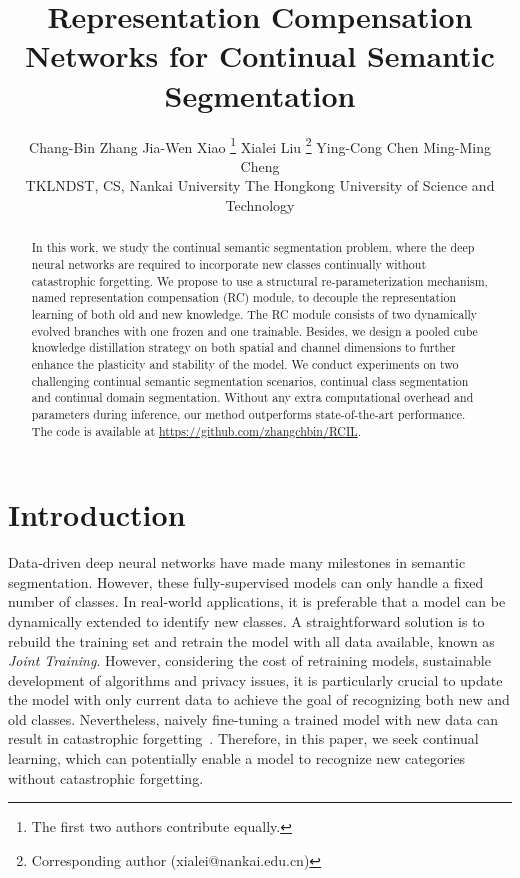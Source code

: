\documentclass[10pt,twocolumn,letterpaper]{article}
\begin{document}
\title{Representation Compensation Networks for Continual Semantic Segmentation}

\author{
Chang-Bin Zhang  \qquad
Jia-Wen Xiao \thanks{The first two authors contribute equally.} \qquad
Xialei Liu \thanks{Corresponding author (xialei@nankai.edu.cn)} \qquad
Ying-Cong Chen  \qquad
Ming-Ming Cheng  \\
 TKLNDST, CS, Nankai University \qquad
 The Hongkong University of Science and Technology\\
}

\maketitle

\begin{abstract}


In this work, we study the continual semantic segmentation problem, where the deep neural networks are required to incorporate new classes continually without catastrophic forgetting. 
We propose to use a structural re-parameterization mechanism, named representation compensation (RC) module,
to decouple the representation learning of both old and new knowledge. The RC module consists of two dynamically evolved branches with one frozen and one trainable.
Besides, we design a pooled cube knowledge distillation strategy 
on both spatial and channel dimensions 
to further enhance the plasticity and stability of the model.
We conduct experiments on two challenging continual semantic segmentation scenarios,
continual class segmentation and continual domain segmentation.
Without any extra computational overhead and parameters during inference, 
our method outperforms state-of-the-art performance.
The code is available at \url{https://github.com/zhangchbin/RCIL}.
\end{abstract}

\section{Introduction}


Data-driven deep neural networks
\cite{seyedhosseini2016semantic,zand2016ontology,nirkin2021hyperseg,zhu2021learning}
have made many milestones in semantic segmentation.
However, these fully-supervised models \cite{ding2020semantic,yang2021is,chen2021spatial}
can only handle a fixed number of classes.
In real-world applications,
it is preferable that a model can be dynamically extended to identify new classes.
A straightforward solution is to rebuild the training set and retrain the model with all data available, known as \emph{Joint Training}.
However, considering the cost of retraining models, 
sustainable development of algorithms and privacy issues, 
it is particularly crucial to update the model with only current data 
to achieve the goal of recognizing both new and old classes.
Nevertheless,
naively fine-tuning a trained model with new data can result in catastrophic forgetting~\cite{kirkpatrick2017overcoming}.
Therefore,
in this paper,
we seek continual learning,
which can potentially enable a model to recognize new categories without catastrophic forgetting.
\end{document}
